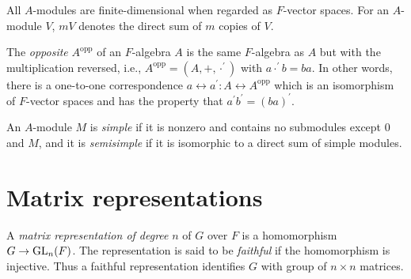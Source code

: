 \documentclass[a4paper,11pt,final,openany]{memoir}%
\theoremstyle{nonumberplain}
\begin{document}
All $A$-modules are finite-dimensional when regarded as $F$-vector spaces. For
an $A$-module $V$, $mV$ denotes the direct sum of $m$ copies of $V$.

The \emph{opposite}%
$A^{\mathrm{opp}}$ of an $F$-algebra $A$ is the same $F$-algebra as $A$ but
with the multiplication reversed, i.e., $A^{\mathrm{opp}}=(A,+,\cdot^{\prime
})$ with $a\cdot^{\prime}b=ba$. In other words, there is a one-to-one
correspondence $a\leftrightarrow a^{\prime}\colon A\leftrightarrow
A^{\mathrm{opp}}$ which is an isomorphism of $F$-vector spaces and has the
property that $a^{\prime}b^{\prime}=(ba)^{\prime}$.

An $A$-module $M$ is \emph{simple}
%
if it is nonzero and contains no submodules except $0$ and $M$, and it is
\emph{semisimple}
%
if it is isomorphic to a direct sum of simple modules.

\section{Matrix representations}

A \emph{matrix representation of degree }$n$
%
of $G$ over $F$ is a homomorphism $G\rightarrow\operatorname{GL}_{n}(F)$. The representation
is said to be \emph{faithful}
%
if the homomorphism is injective. Thus a faithful representation identifies
$G$ with group of $n\times n$ matrices.
\end{document}

